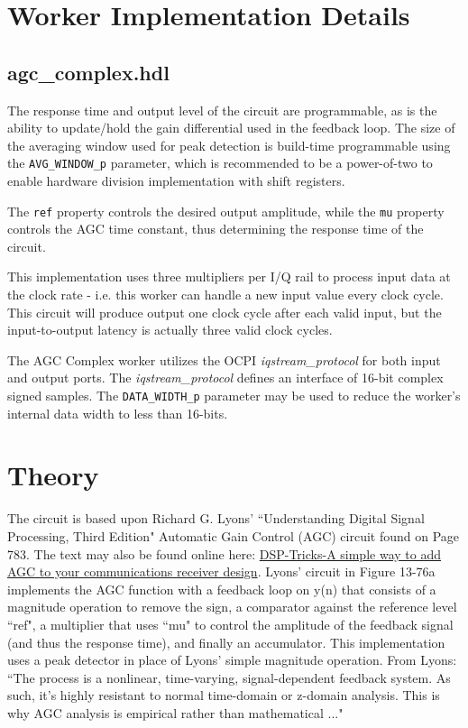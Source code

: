 \documentclass{article}
\def\comp{agc\_complex}
\def\Comp{AGC Complex}
\begin{document}
\section*{Worker Implementation Details}
\subsection*{\comp.hdl}
\begin{flushleft}
	The response time and output level of the circuit are programmable, as is the ability to update/hold the gain differential used in the feedback loop. The size of the averaging window used for peak detection is build-time programmable using the \verb+AVG_WINDOW_p+ parameter, which is recommended to be a power-of-two to enable hardware division implementation with shift registers.\medskip

	The \verb+ref+ property controls the desired output amplitude, while the \verb+mu+ property controls the AGC time constant, thus determining the response time of the circuit.\medskip

	This implementation uses three multipliers per I/Q rail to process input data at the clock rate - i.e. this worker can handle a new input value every clock cycle. This circuit will produce output one clock cycle after each valid input, but the input-to-output latency is actually three valid clock cycles.\medskip

	The {\Comp} worker utilizes the OCPI \textit{iqstream\_protocol} for both input and output ports. The \textit{iqstream\_protocol} defines an interface of 16-bit complex signed samples. The \verb+DATA_WIDTH_p+ parameter may be used to reduce the worker's internal data width to less than 16-bits.
\end{flushleft}

\section*{Theory}
\begin{flushleft}
	The circuit is based upon Richard G. Lyons' ``Understanding Digital Signal Processing, Third Edition" Automatic Gain Control (AGC) circuit found on Page 783. The text may also be found online here: \href{http://www.embedded.com/design/other/4214571/A-simple-way-to-add-AGC-to-your-communications-receiver-design-}{DSP-Tricks-A simple way to add AGC to your communications receiver design}. Lyons' circuit in Figure 13-76a implements the AGC function with a feedback loop on y(n) that consists of a magnitude operation to remove the sign, a comparator against the reference level ``ref", a multiplier that uses ``mu" to control the amplitude of the feedback signal (and thus the response time), and finally an accumulator. This implementation uses a peak detector in place of Lyons' simple magnitude operation. From Lyons: ``The process is a nonlinear, time-varying, signal-dependent feedback system. As such, it's highly resistant to normal time-domain or z-domain analysis. This is why AGC analysis is empirical rather than mathematical ..."
\end{flushleft}
\end{document}

